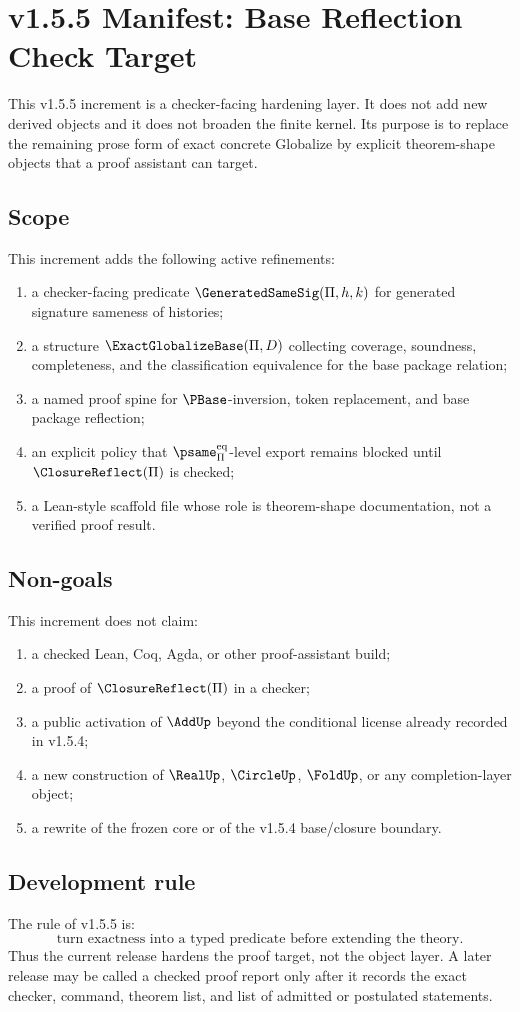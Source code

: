 \chapter{v1.5.5 Manifest: Base Reflection Check Target}
\label{ch:v155-manifest}

This v1.5.5 increment is a checker-facing hardening layer. It does not add new derived objects and it does not broaden the finite kernel. Its purpose is to replace the remaining prose form of exact concrete Globalize by explicit theorem-shape objects that a proof assistant can target.

\section{Scope}
This increment adds the following active refinements:
\begin{enumerate}
  \item a checker-facing predicate \(\GeneratedSameSig(\Pi,h,k)\) for generated signature sameness of histories;
  \item a structure \(\ExactGlobalizeBase(\Pi,D)\) collecting coverage, soundness, completeness, and the classification equivalence for the base package relation;
  \item a named proof spine for \(\PBase\)-inversion, token replacement, and base package reflection;
  \item an explicit policy that \(\psame_{\Pi}^{\mathrm{eq}}\)-level export remains blocked until \(\ClosureReflect(\Pi)\) is checked;
  \item a Lean-style scaffold file whose role is theorem-shape documentation, not a verified proof result.
\end{enumerate}

\section{Non-goals}
This increment does not claim:
\begin{enumerate}
  \item a checked Lean, Coq, Agda, or other proof-assistant build;
  \item a proof of \(\ClosureReflect(\Pi)\) in a checker;
  \item a public activation of \(\AddUp\) beyond the conditional license already recorded in v1.5.4;
  \item a new construction of \(\RealUp\), \(\CircleUp\), \(\FoldUp\), or any completion-layer object;
  \item a rewrite of the frozen core or of the v1.5.4 base/closure boundary.
\end{enumerate}

\section{Development rule}
The rule of v1.5.5 is:
\[
  \text{turn exactness into a typed predicate before extending the theory.}
\]
Thus the current release hardens the proof target, not the object layer. A later release may be called a checked proof report only after it records the exact checker, command, theorem list, and list of admitted or postulated statements.
